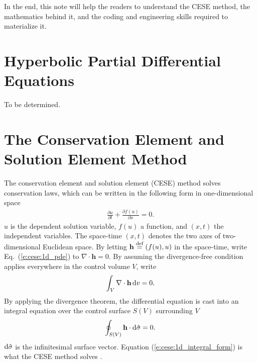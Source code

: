\documentclass{turgon}
\begin{document}
In the end, this note will help the readers to understand the CESE method, the
mathematics behind it, and the coding and engineering skills required to
materialize it.

\chapter{Hyperbolic Partial Differential Equations}
\label{c:hyper}

To be determined.


\chapter{The Conservation Element and Solution Element Method}
\label{c:cese}


The conservation element and solution element (CESE) method solves conservation
laws, which can be written in the following form in one-dimensional space
\begin{align}
  \frac{\partial u}{\partial t} + \frac{\partial f(u)}{\partial x} = 0
  .
  \label{e:cese:1d_pde}
\end{align}
$u$ is the dependent solution variable, $f(u)$ a function, and $(x, t)$ the
independent variables.  The space-time $(x, t)$ denotes the two axes of
two-dimensional Euclidean space.  By letting $\mathbf{h} \defeq (f(u),u)$ in
the space-time, write Eq.~(\ref{e:cese:1d_pde}) to $\nabla\cdot\mathbf{h} = 0$.
By assuming the divergence-free condition applies everywhere in the control
volume $V$, write
\begin{align*}
  \int_V\nabla\cdot\mathbf{h}\mathop{}\!\mathrm{d} v = 0
  .
\end{align*}
By applying the divergence theorem, the differential equation is cast into an
integral equation over the control surface $S(V)$ surrounding $V$
\begin{align}
  \oint_{S(V)}\mathbf{h}\cdot\mathop{}\!\mathrm{d}\hat{\sigma} = 0
  .  \label{e:cese:1d_integral_form}
\end{align}
$\mathop{}\!\mathrm{d}\hat{\sigma}$ is the infinitesimal surface vector.
Equation (\ref{e:cese:1d_integral_form}) is what the CESE method solves
\citep{chang_method_1995}.
\end{document}
